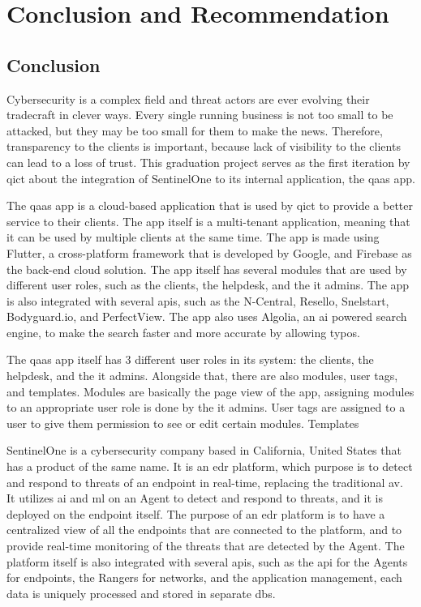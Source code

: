 \chapter{Conclusion and Recommendation}
\section{Conclusion}
Cybersecurity is a complex field and threat actors are ever evolving their tradecraft in clever ways. Every single
running business is not too small to be attacked, but they may be too small for them to make the news. Therefore, transparency
to the clients is important, because lack of visibility to the clients can lead to a loss of trust. This graduation project serves
as the first iteration by \acrshort{qict} about the integration of SentinelOne to its internal application, the \acrshort{qaas} app.

The \acrshort{qaas} app is a cloud-based application that is used by \acrshort{qict} to provide a better service to their clients.
The app itself is a multi-tenant application, meaning that it can be used by multiple clients at the same time. The app is made
using Flutter, a cross-platform framework that is developed by Google, and Firebase as the back-end cloud solution. The app itself
has several modules that are used by different user roles, such as the clients, the helpdesk, and the \acrshort{it} admins. The app
is also integrated with several \acrshort{api}s, such as the N-Central, Resello, Snelstart, Bodyguard.io, and PerfectView. The app
also uses Algolia, an \acrshort{ai} powered search engine, to make the search faster and more accurate by allowing typos.

The \acrshort{qaas} app itself has 3 different user roles in its system: the clients, the helpdesk, and the \acrshort{it} admins.
Alongside that, there are also modules, user tags, and templates. Modules are basically the page view of the app, assigning modules
to an appropriate user role is done by the \acrshort{it} admins. User tags are assigned to a user to give them permission to see
or edit certain modules. Templates

SentinelOne is a cybersecurity company based in California, United States that has a product of the same name. It is an \acrshort{edr}
platform, which purpose is to detect and respond to threats of an endpoint in real-time, replacing the traditional \acrshort{av}.
It utilizes \acrshort{ai} and \acrshort{ml} on an Agent to detect and respond to threats, and it is deployed on the endpoint itself.
The purpose of an \acrshort{edr} platform is to have a centralized view of all the endpoints that are connected to the platform, and
to provide real-time monitoring of the threats that are detected by the Agent. The platform itself is also integrated with several
\acrshort{api}s, such as the \acrshort{api} for the Agents for endpoints, the Rangers for networks, and the application management,
each data is uniquely processed and stored in separate \acrshort{db}s.

